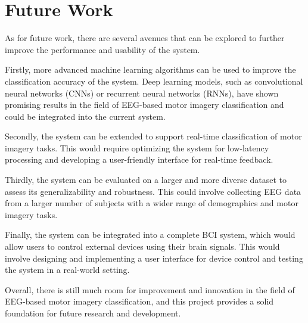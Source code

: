 \documentclass[12pt,a4paper]{report}
\begin{document}
	\section{Future Work}
	\justify As for future work, there are several avenues that can be explored to further improve the performance and usability of the system.
	
	\justify Firstly, more advanced machine learning algorithms can be used to improve the classification accuracy of the system. Deep learning models, such as convolutional neural networks (CNNs) or recurrent neural networks (RNNs), have shown promising results in the field of EEG-based motor imagery classification and could be integrated into the current system.
	
	\justify Secondly, the system can be extended to support real-time classification of motor imagery tasks. This would require optimizing the system for low-latency processing and developing a user-friendly interface for real-time feedback.
	
	\justify Thirdly, the system can be evaluated on a larger and more diverse dataset to assess its generalizability and robustness. This could involve collecting EEG data from a larger number of subjects with a wider range of demographics and motor imagery tasks.
	
	\justify Finally, the system can be integrated into a complete BCI system, which would allow users to control external devices using their brain signals. This would involve designing and implementing a user interface for device control and testing the system in a real-world setting.
	
	\justify Overall, there is still much room for improvement and innovation in the field of EEG-based motor imagery classification, and this project provides a solid foundation for future research and development.

	

\end{document}
